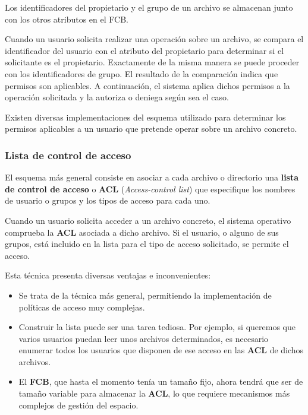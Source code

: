 Los identificadores del propietario y el grupo de un archivo se
almacenan junto con los otros atributos en el FCB.

Cuando un usuario solicita realizar una operación sobre un archivo, se
compara el identificador del usuario con el atributo del propietario
para determinar si el solicitante es el propietario. Exactamente de la
misma manera se puede proceder con los identificadores de grupo. El
resultado de la comparación indica que permisos son aplicables. A
continuación, el sistema aplica dichos permisos a la operación
solicitada y la autoriza o deniega según sea el caso.

Existen diversas implementaciones del esquema utilizado para determinar
los permisos aplicables a un usuario que pretende operar sobre un
archivo concreto.

\subsubsection{Lista de control de
acceso}\label{_lista_de_control_de_acceso}

El esquema más general consiste en asociar a cada archivo o directorio
una \textbf{lista de control de acceso}{} o \textbf{{}ACL}
(\emph{Access-control list}) que especifique los nombres de usuario o
grupos y los tipos de acceso para cada uno.

Cuando un usuario solicita acceder a un archivo concreto, el sistema
operativo comprueba la \textbf{ACL} asociada a dicho archivo. Si el
usuario, o alguno de sus grupos, está incluido en la lista para el tipo
de acceso solicitado, se permite el acceso.

Esta técnica presenta diversas ventajas e inconvenientes:

\begin{itemize}
\item
  Se trata de la técnica más general, permitiendo la implementación de
  políticas de acceso muy complejas.
\item
  Construir la lista puede ser una tarea tediosa. Por ejemplo, si
  queremos que varios usuarios puedan leer unos archivos determinados,
  es necesario enumerar todos los usuarios que disponen de ese acceso en
  las \textbf{ACL} de dichos archivos.
\item
  El \textbf{FCB}, que hasta el momento tenía un tamaño fijo, ahora
  tendrá que ser de tamaño variable para almacenar la \textbf{ACL}, lo
  que requiere mecanismos más complejos de gestión del espacio.
\end{itemize}

